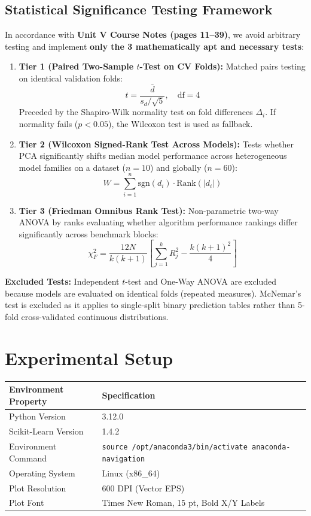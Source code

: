 \documentclass[12pt,a4paper]{article}
\begin{document}
\subsection{Statistical Significance Testing Framework}
In accordance with \textbf{Unit V Course Notes (pages 11--39)}, we avoid arbitrary testing and implement \textbf{only the 3 mathematically apt and necessary tests}:
\begin{enumerate}
    \item \textbf{Tier 1 (Paired Two-Sample $t$-Test on CV Folds):} Matched pairs testing on identical validation folds:
    $$t = \frac{\bar{d}}{s_d / \sqrt{5}}, \quad \text{df}=4$$
    Preceded by the Shapiro-Wilk normality test on fold differences $\Delta_i$. If normality fails ($p < 0.05$), the Wilcoxon test is used as fallback.
    \item \textbf{Tier 2 (Wilcoxon Signed-Rank Test Across Models):} Tests whether PCA significantly shifts median model performance across heterogeneous model families on a dataset ($n=10$) and globally ($n=60$):
    $$W = \sum_{i=1}^n \text{sgn}(d_i) \cdot \text{Rank}(|d_i|)$$
    \item \textbf{Tier 3 (Friedman Omnibus Rank Test):} Non-parametric two-way ANOVA by ranks evaluating whether algorithm performance rankings differ significantly across benchmark blocks:
    $$\chi_F^2 = \frac{12 N}{k(k+1)} \left[ \sum_{j=1}^k R_j^2 - \frac{k(k+1)^2}{4} \right]$$
\end{enumerate}
\textbf{Excluded Tests:} Independent $t$-test and One-Way ANOVA are excluded because models are evaluated on identical folds (repeated measures). McNemar's test is excluded as it applies to single-split binary prediction tables rather than 5-fold cross-validated continuous distributions.

\section{Experimental Setup}
\begin{table}[H]
\centering
\begin{tabular}{ll}
\toprule
\textbf{Environment Property} & \textbf{Specification} \\
\midrule
Python Version & 3.12.0 \\
Scikit-Learn Version & 1.4.2 \\
Environment Command & \texttt{source /opt/anaconda3/bin/activate anaconda-navigation} \\
Operating System & Linux (x86\_64) \\
Plot Resolution & 600 DPI (Vector EPS) \\
Plot Font & Times New Roman, 15 pt, Bold X/Y Labels \\
\bottomrule
\end{tabular}
\end{table}
\end{document}
